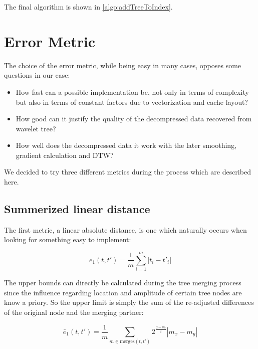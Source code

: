 The final algorithm is shown in \autoref{algo:addTreeToIndex}.



\section{Error Metric}
\label{sec:algorithm:error}

The choice of the error metric, while being easy in many cases, opposes some questions in our case:

\begin{itemize}
    \item How fast can a possible implementation be, not only in terms of complexity but also in terms of constant factors due to vectorization and cache layout?
    \item How good can it justify the quality of the decompressed data recovered from wavelet tree?
    \item How well does the decompressed data it work with the later smoothing, gradient calculation and DTW\@?
\end{itemize}

We decided to try three different metrics during the process which are described here.


\subsection{Summerized linear distance}
\label{ssec:algorithm:error:linear}

The first metric, a linear absolute distance, is one which naturally occurs when looking for something easy to implement:

\begin{equation}\label{eq:e1}
    e_1\left(t, t'\right) = \frac{1}{m} \sum_{i=1}^m \left|t_i - t'_i\right|
\end{equation}

The upper bounds can directly be calculated during the tree merging process since the influence regarding location and amplitude of certain tree nodes are know a priory. So the upper limit is simply the sum of the re-adjusted differences of the original node and the merging partner:

\begin{equation}\label{eq:e1_up}
    \bar{e}_1\left(t, t'\right) = \frac{1}{m} \sum_{m \in \mathrm{merges}(t, t')} 2^\frac{d - m_l}{2} \left|m_x - m_y\right|
\end{equation}

